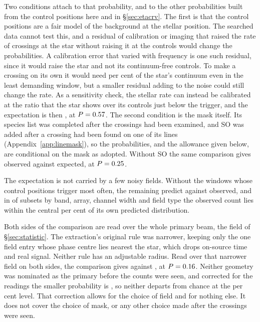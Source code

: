 Two conditions attach to that probability, and to the other probabilities
built from the control positions here and in \S\ref{sec:etacrv}. The first
is that the control positions are a fair model of the background at the
stellar position. The searched data cannot test this, and a residual of
calibration or imaging that raised the rate of crossings at the star without
raising it at the controls would change the probabilities. A calibration
error that varied with frequency is one such residual, since it would raise
the star and not its continuum-free controls. To make a crossing on its own
it would need \CyEpsMinPct{} per cent of the star's continuum even in the
least demanding window, but a smaller residual adding to the noise could
still change the rate. As a sensitivity
check, the stellar rate can instead be calibrated at the ratio \CeNear{}
that the star shows over its controls just below the trigger, and the
expectation is then \CeExpNear{}, at $P=0.57$. The second condition
is the mask itself. Its species list was completed after the crossings had
been examined, and SO was added after a crossing had been found on one of its
lines (Appendix~\ref{app:linemask}), so the probabilities, and the allowance
given below, are conditional on the mask as adopted. Without SO the same
comparison gives \MkNoSOObs{} observed against \MkNoSOExp{} expected, at
$P=0.25$.

The expectation is not carried by a few noisy fields. Without the
\BgTopNWord{} windows whose control positions trigger most often, the
remaining \BgDropTenNWin{} predict \BgDropTenExp{} against \BgDropTenObs{}
observed, and in \BgNConfIn{} of \BgNConf{} subsets by band, array, channel
width and field type the observed count lies within the central \CeCovPct{}
per cent of its own predicted distribution.

Both sides of the comparison are read over the whole primary beam, the field
of \S\ref{sec:statistic}. The extraction's original rule was narrower,
keeping only the one field entry whose phase centre lies nearest the star,
which drops on-source time and real signal. Neither rule has an adjustable
radius. Read over that narrower field on both sides, the comparison gives
\FrNarrowObs{} against \FrNarrowExp{}, at $P=0.16$. Neither geometry
was nominated as the primary before the counts were seen, and corrected for
the \FrNRead{} readings the smaller probability is \FrTwoTrialP, so neither
departs from chance at the \CeAlphaPct{} per cent level. That correction
allows for the choice of field and for nothing else. It does not cover the
choice of mask, or any other choice made after the crossings were seen.

